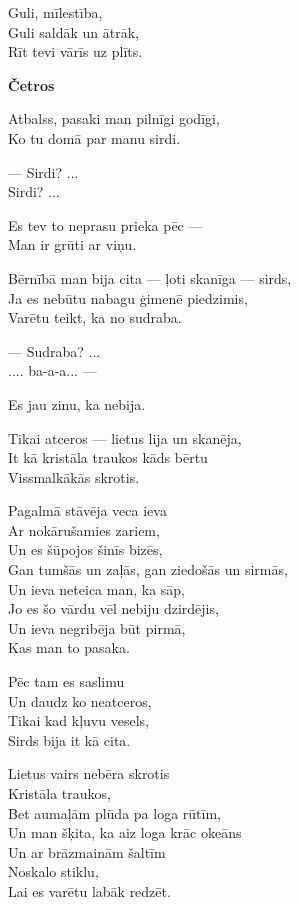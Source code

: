 \documentclass[14pt]{extarticle}
\begin{document}
Guli, mīlestība,\\
Guli saldāk un ātrāk,\\
Rīt tevi vārīs uz plīts.



\newpage

{\bf Četros}

Atbalss, pasaki man pilnīgi godīgi,\\
Ko tu domā par manu sirdi.

--- Sirdi? ...\\
Sirdi? ...

Es tev to neprasu prieka pēc ---\\
Man ir grūti ar viņu.

Bērnībā man bija cita --- ļoti skanīga --- sirds,\\
Ja es nebūtu nabagu ģimenē piedzimis,\\
Varētu teikt, ka no sudraba.

--- Sudraba? ...\\
.... ba-a-a... ---

Es jau zinu, ka nebija.

Tikai atceros --- lietus lija un skanēja,\\
It kā kristāla traukos kāds bērtu\\
Vissmalkākās skrotis.

Pagalmā stāvēja veca ieva\\
Ar nokārušamies zariem,\\
Un es šūpojos šinīs bizēs,\\
Gan tumšās un zaļās, gan ziedošās un sirmās,\\
Un ieva neteica man, ka sāp,\\
Jo es šo vārdu vēl nebiju dzirdējis,\\
Un ieva negribēja būt pirmā,\\
Kas man to pasaka.

Pēc tam es saslimu\\
Un daudz ko neatceros,\\
Tikai kad kļuvu vesels,\\
Sirds bija it kā cita.

Lietus vairs nebēra skrotis\\
Kristāla traukos,\\
Bet aumaļām plūda pa loga rūtīm,\\
Un man šķita, ka aiz loga krāc okeāns\\
Un ar brāzmainām šaltīm\\
Noskalo stiklu,\\
Lai es varētu labāk redzēt.
\end{document}
